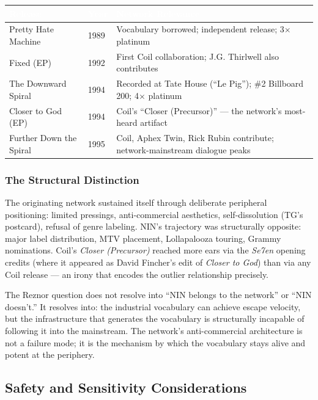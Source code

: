 \documentclass[11pt,letterpaper]{article}
\newcommand{\tableheader}[1]{\textbf{\sffamily\textcolor{white}{#1}}}
\begin{document}
\begin{center}
\begin{tabularx}{\textwidth}{L{4cm}L{2cm}X}
\toprule
{}
\tableheader{Release} & \tableheader{Year} & \tableheader{Network Relevance} \\
\midrule
Pretty Hate Machine & 1989 & Vocabulary borrowed; independent release; 3$\times$ platinum \\
Fixed (EP) & 1992 & First Coil collaboration; J.G. Thirlwell also contributes \\
The Downward Spiral & 1994 & Recorded at Tate House (``Le Pig''); \#2 Billboard 200; 4$\times$ platinum \\
Closer to God (EP) & 1994 & Coil's ``Closer (Precursor)'' — the network's most-heard artifact \\
Further Down the Spiral & 1995 & Coil, Aphex Twin, Rick Rubin contribute; network-mainstream dialogue peaks \\
\bottomrule
\end{tabularx}
\end{center}

\subsubsection{The Structural Distinction}

The originating network sustained itself through deliberate peripheral positioning: limited
pressings, anti-commercial aesthetics, self-dissolution (TG's postcard), refusal of genre
labeling. NIN's trajectory was structurally opposite: major label distribution, MTV placement,
Lollapalooza touring, Grammy nominations. Coil's \textit{Closer (Precursor)} reached more ears
via the \textit{Se7en} opening credits (where it appeared as David Fincher's edit of
\textit{Closer to God}) than via any Coil release — an irony that encodes the outlier
relationship precisely.

The Reznor question does not resolve into ``NIN belongs to the network'' or ``NIN doesn't.''
It resolves into: the industrial vocabulary can achieve escape velocity, but the infrastructure
that generates the vocabulary is structurally incapable of following it into the mainstream.
The network's anti-commercial architecture is not a failure mode; it is the mechanism by which
the vocabulary stays alive and potent at the periphery.

\subsection{Safety and Sensitivity Considerations}
\end{document}
